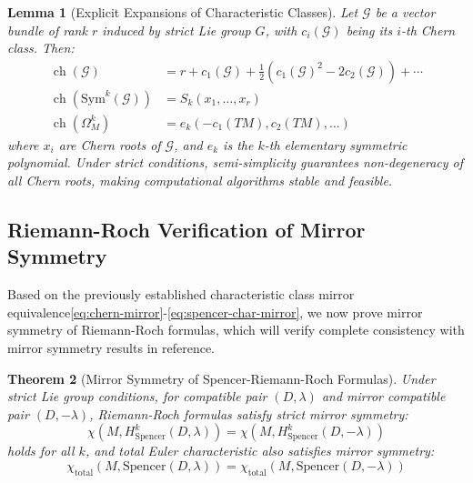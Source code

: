 \documentclass[a4paper,12pt]{extarticle}
\newtheorem{theorem}{Theorem}
\newtheorem{lemma}[theorem]{Lemma}
\newcommand{\ch}{\operatorname{ch}}
\theoremstyle{definition}
\begin{document}
\begin{lemma}[Explicit Expansions of Characteristic Classes]
Let $\mathcal{G}$ be a vector bundle of rank $r$ induced by strict Lie group $G$, with $c_i(\mathcal{G})$ being its $i$-th Chern class. Then:
\begin{align}
\ch(\mathcal{G}) &= r + c_1(\mathcal{G}) + \frac{1}{2}(c_1(\mathcal{G})^2 - 2c_2(\mathcal{G})) + \cdots \label{eq:chern-expansion}\\
\ch(\mathrm{Sym}^k(\mathcal{G})) &= S_k(x_1, \ldots, x_r) \label{eq:sym-chern-roots}\\
\ch(\Omega^k_M) &= e_k(-c_1(TM), c_2(TM), \ldots) \label{eq:diff-chern-elementary}
\end{align}
where $x_i$ are Chern roots of $\mathcal{G}$, and $e_k$ is the $k$-th elementary symmetric polynomial\cite{macdonald1998symmetric}. Under strict conditions, semi-simplicity guarantees non-degeneracy of all Chern roots, making computational algorithms stable and feasible.
\end{lemma}

\subsection{Riemann-Roch Verification of Mirror Symmetry}

Based on the previously established characteristic class mirror equivalence\eqref{eq:chern-mirror}-\eqref{eq:spencer-char-mirror}, we now prove mirror symmetry of Riemann-Roch formulas, which will verify complete consistency with mirror symmetry results in reference\cite{zheng2025mirror}.

\begin{theorem}[Mirror Symmetry of Spencer-Riemann-Roch Formulas]
Under strict Lie group conditions, for compatible pair $(D,\lambda)$ and mirror compatible pair $(D,-\lambda)$, Riemann-Roch formulas satisfy strict mirror symmetry:
\begin{equation}\label{eq:individual-mirror-rr}
\chi(M, H^k_{\mathrm{Spencer}}(D,\lambda)) = \chi(M, H^k_{\mathrm{Spencer}}(D,-\lambda))
\end{equation}
holds for all $k$, and total Euler characteristic also satisfies mirror symmetry:
\begin{equation}\label{eq:total-mirror-rr}
\chi_{\mathrm{total}}(M, \mathrm{Spencer}(D,\lambda)) = \chi_{\mathrm{total}}(M, \mathrm{Spencer}(D,-\lambda))
\end{equation}
\end{theorem}
\end{document}
